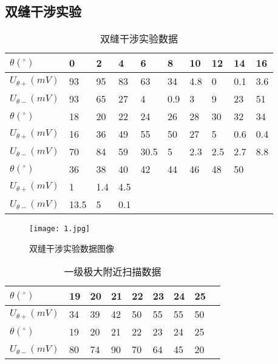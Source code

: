 \documentclass[12pt,a4paper]{article}
\begin{document}
    \subsection{双缝干涉实验}
    \begin{table}[H]
        \centering
        \caption{双缝干涉实验数据}
        \begin{tabular}{|l|l|l|l|l|l|l|l|l|l|}
        \hline
            $\theta(^\circ)$ & 0 & 2 & 4 & 6 & 8 & 10 & 12 & 14 & 16 \\ \hline
            $U_{\theta+}(mV)$ & 93 & 95 & 83 & 63 & 34 & 4.8 & 0 & 0.1 & 3.6 \\ \hline
            $U_{\theta-}(mV)$ & 93 & 65 & 27 & 4 & 0.9 & 3 & 9 & 23 & 51 \\ \hline
            $\theta(^\circ)$ & 18 & 20 & 22 & 24 & 26 & 28 & 30 & 32 & 34 \\ \hline
            $U_{\theta+}(mV)$ & 16 & 36 & 49 & 55 & 50 & 27 & 5 & 0.6 & 0.4 \\ \hline
            $U_{\theta-}(mV)$ & 70 & 84 & 59 & 30.5 & 5 & 2.3 & 2.5 & 2.7 & 8.8 \\ \hline
            $\theta(^\circ)$ & 36 & 38 & 40 & 42 & 44 & 46 & 48 & 50 & ~ \\ \hline
            $U_{\theta+}(mV)$ & 1 & 1.4 & 4.5 & & &&&&\\ \hline
            $U_{\theta-}(mV)$ & 13.5 & 5 & 0.1 &  &&&&& \\ \hline
        \end{tabular}
    \end{table}
    \begin{figure}[H]
        \caption{双缝干涉实验数据图像}
        \centering
        \texttt{[image: 1.jpg]}
    \end{figure}
    \begin{table}[H]
        \centering
        \caption{一级极大附近扫描数据}
        \begin{tabular}{|l|l|l|l|l|l|l|l|l|}
        \hline
            $\theta(^\circ)$ & 19 & 20 & 21 & 22 & 23 & 24 & 25  \\ \hline
            $U_{\theta+}(mV)$ & 34 & 39 & 42 & 50 & 55 & 55 & 50 \\ \hline
            $\theta(^\circ)$ & 19 & 20 & 21 & 22 & 23 & 24 & 25  \\ \hline
            $U_{\theta-}(mV)$ & 80 & 74 & 90 & 70 & 64 & 45 & 20  \\ \hline
        \end{tabular}
    \end{table}
\end{document}

